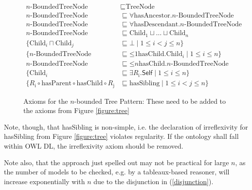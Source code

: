 \begin{figure}[t]
\begin{align}
n\text{-BoundedTreeNode} &\sqsubseteq \text{TreeNode} \\
n\text{-BoundedTreeNode} &\sqsubseteq \forall \text{hasAncestor}.n\text{-BoundedTreeNode} \\
n\text{-BoundedTreeNode} &\sqsubseteq \forall \text{hasDescendant}.n\text{-BoundedTreeNode} \\
n\text{-BoundedTreeNode} &\sqsubseteq \text{Child}_1 \sqcup \ldots \sqcup \text{Child}_n \label{disjunction} \\
\{\text{Child}_i \sqcap \text{Child}_j &\sqsubseteq \bot \mid 1 \leq i < j \leq n \} \label{disjoint} \\
\{n\text{-BoundedTreeNode} &\sqsubseteq \mathord{\leq} 1 \text{hasChild}.\text{Child}_i \mid 1 \leq i \leq n\} \label{atMost1Childi}\\
n\text{-BoundedTreeNode} &\sqsubseteq \mathord{\leq} n \text{hasChild}.n\text{-BoundedTreeNode} \\
\{\text{Child}_i &\sqsubseteq \exists R_\text{i}.\textsf{Self} \mid 1 \leq i \leq n\} \label{selfConnect} \\
\{R_\text{i} \circ \text{hasParent} \circ \text{hasChild} \circ R_\text{j} &\sqsubseteq \text{hasSibling} \mid 1 \leq i < j \leq n \} \label{chain} 
\end{align}
\caption{Axioms for the $n$-bounded Tree Pattern: These need to be added to the axioms from Figure \ref{figure:tree}}
\label{figure:binaryTreeAxioms}
\end{figure}

Note, though, that hasSibling is non-simple, i.e. the declaration of irreflexivity for hasSibling from Figure \ref{figure:tree} violates regularity. If the ontology shall fall within OWL DL, the irreflexivity axiom should be removed.

Note also, that the approach just spelled out may not be practical for large $n$, as the number of models to be checked, e.g. by a tableaux-based reasoner, will increase exponentially with $n$ due to the disjunction in (\ref{disjunction}).









